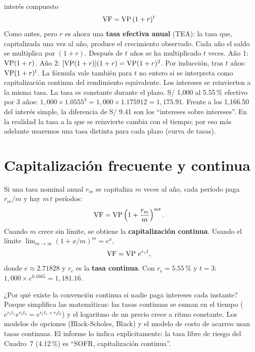 \begin{ficha}{interés compuesto}
\[ \operatorname{VF} = \operatorname{VP}\,(1+r)^t \]
 Como antes, pero $r$ es ahora una \textbf{tasa efectiva anual} (TEA): la tasa que, capitalizada una vez al año, produce el crecimiento observado.
 Cada año el saldo se multiplica por $(1+r)$. Después de $t$ años se ha multiplicado $t$ veces.
 Año 1: $\operatorname{VP}(1+r)$. Año 2: $[\operatorname{VP}(1+r)](1+r)=\operatorname{VP}(1+r)^2$. Por inducción, tras $t$ años: $\operatorname{VP}(1+r)^t$. La fórmula vale también para $t$ no entero si se interpreta como capitalización continua del rendimiento equivalente.
 Los intereses se reinvierten a la misma tasa. La tasa es constante durante el plazo.
 S/ 1,000 al 5.55\,\% efectivo por 3 años: $1{,}000\times1.0555^3=1{,}000\times1.175912=1{,}175.91$.
 Frente a los 1,166.50 del interés simple, la diferencia de S/ 9.41 son los \enquote{intereses sobre intereses}.
 En la realidad la tasa a la que se reinvierte cambia con el tiempo; por eso más adelante usaremos una tasa distinta para cada plazo (curva de tasas).
\end{ficha}

\section{Capitalización frecuente y continua}

Si una tasa nominal anual $r_m$ se capitaliza $m$ veces al año, cada período paga $r_m/m$ y hay $m\,t$ períodos:
\[ \operatorname{VF}=\operatorname{VP}\left(1+\frac{r_m}{m}\right)^{m t}. \]
Cuando $m$ crece sin límite, se obtiene la \textbf{capitalización continua}. Usando el límite $\lim_{m\to\infty}(1+x/m)^m=e^x$,
\[ \operatorname{VF}=\operatorname{VP}\,e^{r_c t}, \]
donde $e\approx2.71828$ y $r_c$ es la \textbf{tasa continua}. Con $r_c=5.55\,\%$ y $t=3$: $1{,}000\times e^{0.1665}=1{,}181.16$.


¿Por qué existe la convención continua si nadie paga intereses cada instante? Porque simplifica las matemáticas: las tasas continuas se suman en el tiempo ($e^{r_1t_1}e^{r_2t_2}=e^{r_1t_1+r_2t_2}$) y el logaritmo de un precio crece a ritmo constante. Los modelos de opciones (Black-Scholes, Black) y el modelo de costo de acarreo usan tasas continuas. El informe lo indica explícitamente: la tasa libre de riesgo del Cuadro~7 (4.12\,\%) es \enquote{SOFR, capitalización continua}.

